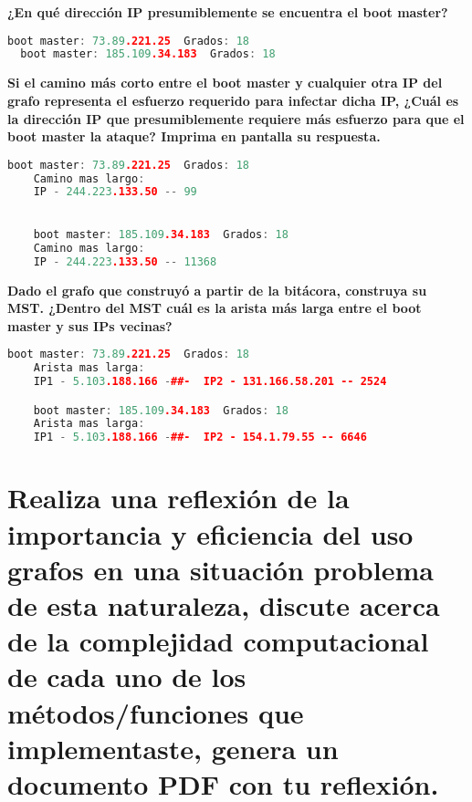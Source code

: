\documentclass{article}
\begin{document}
\newpage
\begin{question}
  \textbf{¿En qué dirección IP presumiblemente se encuentra el boot master?}
\end{question}

\begin{file}
\begin{lstlisting}[language=C++]
  boot master: 73.89.221.25  Grados: 18
  boot master: 185.109.34.183  Grados: 18
\end{lstlisting}
\end{file}

\begin{question}
  \textbf{Si el camino más corto entre el boot master y cualquier otra IP del grafo representa el esfuerzo requerido para infectar dicha IP, ¿Cuál es la dirección IP que presumiblemente requiere más esfuerzo para que el boot master la ataque? Imprima en pantalla su respuesta.}
\end{question}

\begin{file}
  \begin{lstlisting}[language=C++]
    boot master: 73.89.221.25  Grados: 18
    Camino mas largo: 
    IP - 244.223.133.50 -- 99

    
    boot master: 185.109.34.183  Grados: 18
    Camino mas largo: 
    IP - 244.223.133.50 -- 11368
  \end{lstlisting}
\end{file}

\begin{question}
  \textbf{Dado el grafo que construyó a partir de la bitácora, construya su MST. ¿Dentro del MST cuál es la arista más larga entre el boot master y sus IPs vecinas?}
\end{question}

\begin{file}
  \begin{lstlisting}[language=C++]
    boot master: 73.89.221.25  Grados: 18
    Arista mas larga: 
    IP1 - 5.103.188.166 -##-  IP2 - 131.166.58.201 -- 2524

    boot master: 185.109.34.183  Grados: 18
    Arista mas larga: 
    IP1 - 5.103.188.166 -##-  IP2 - 154.1.79.55 -- 6646
  \end{lstlisting}
\end{file}

\section{Realiza una reflexión de la importancia y eficiencia del uso grafos en una situación problema de esta naturaleza, discute acerca de la complejidad computacional de cada uno de los métodos/funciones que implementaste, genera un documento PDF con tu reflexión.}
\end{document}
